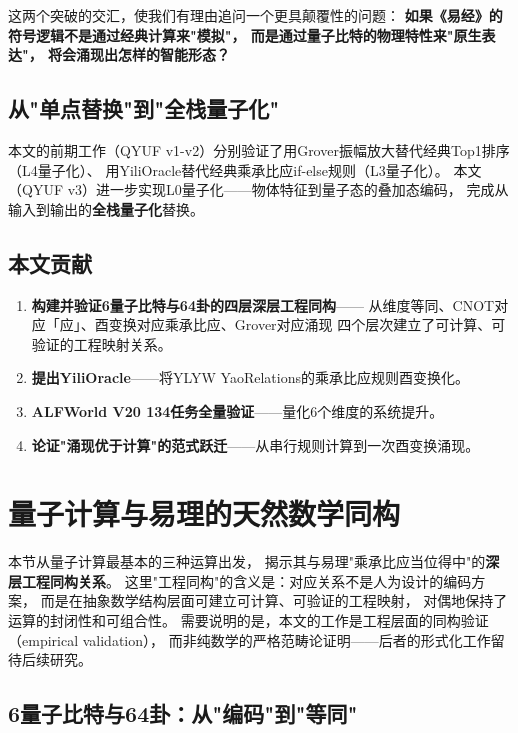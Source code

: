 \documentclass[twocolumn]{article}
\begin{document}
这两个突破的交汇，使我们有理由追问一个更具颠覆性的问题：
\textbf{如果《易经》的符号逻辑不是通过经典计算来"模拟"，
而是通过量子比特的物理特性来"原生表达"，
将会涌现出怎样的智能形态？}

\subsection{从"单点替换"到"全栈量子化"}

本文的前期工作（QYUF v1-v2）分别验证了用Grover振幅放大替代经典Top1排序（L4量子化）、
用YiliOracle替代经典乘承比应if-else规则（L3量子化）。
本文（QYUF v3）进一步实现L0量子化——物体特征到量子态的叠加态编码，
完成从输入到输出的\textbf{全栈量子化}替换。

\subsection{本文贡献}

\begin{enumerate}
  \item \textbf{构建并验证6量子比特与64卦的四层深层工程同构}——
        从维度等同、CNOT对应「应」、酉变换对应乘承比应、Grover对应涌现
        四个层次建立了可计算、可验证的工程映射关系。
  \item \textbf{提出YiliOracle}——将YLYW YaoRelations的乘承比应规则酉变换化。
  \item \textbf{ALFWorld V20 134任务全量验证}——量化6个维度的系统提升。
  \item \textbf{论证"涌现优于计算"的范式跃迁}——从串行规则计算到一次酉变换涌现。
\end{enumerate}

\section{量子计算与易理的天然数学同构}

本节从量子计算最基本的三种运算出发，
揭示其与易理"乘承比应当位得中"的\textbf{深层工程同构关系}。
这里"工程同构"的含义是：对应关系不是人为设计的编码方案，
而是在抽象数学结构层面可建立可计算、可验证的工程映射，
对偶地保持了运算的封闭性和可组合性。
需要说明的是，本文的工作是工程层面的同构验证（empirical validation），
而非纯数学的严格范畴论证明——后者的形式化工作留待后续研究。

\subsection{6量子比特与64卦：从"编码"到"等同"}
\end{document}
